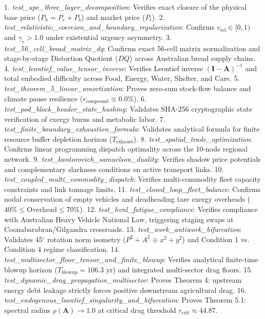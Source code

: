 \documentclass[preprint,12pt,authoryear]{elsarticle}
\theoremstyle{definition}
\begin{document}
1.  \textit{test\_upe\_three\_layer\_decomposition}: Verifies exact closure of the physical base price ($P_h = P_e + P_b$) and market price ($P_t$).
2.  \textit{test\_relativistic\_coercion\_and\_boundary\_regularization}: Confirms $v_{\text{rel}} \in [0, 1)$ and $\gamma_v > 1.0$ under existential urgency asymmetry.
3.  \textit{test\_56\_cell\_bread\_matrix\_dq}: Confirms exact 56-cell matrix normalization and stage-by-stage Distortion Quotient ($DQ$) across Australian bread supply chains.
4.  \textit{test\_leontief\_value\_tensor\_inverse}: Verifies Leontief inverse $(\mathbf{I} - \mathbf{A})^{-1}$ and total embodied difficulty across Food, Energy, Water, Shelter, and Care.
5.  \textit{test\_theorem\_5\_linear\_amortization}: Proves zero-sum stock-flow balance and climate pause resilience ($r_{\text{compound}} \equiv 0.0\%$).
6.  \textit{test\_pod\_block\_header\_state\_hashing}: Validates SHA-256 cryptographic state verification of exergy burns and metabolic labor.
7.  \textit{test\_finite\_boundary\_exhaustion\_formula}: Validates analytical formula for finite resource buffer depletion horizon ($T_{\text{exhaust}}$).
8.  \textit{test\_spatial\_trade\_optimization}: Confirms linear programming dispatch optimality across the 10-node regional network.
9.  \textit{test\_kantorovich\_samuelson\_duality}: Verifies shadow price potentials and complementary slackness conditions on active transport links.
10. \textit{test\_coupled\_multi\_commodity\_dispatch}: Verifies multi-commodity fleet capacity constraints and link tonnage limits.
11. \textit{test\_closed\_loop\_fleet\_balance}: Confirms nodal conservation of empty vehicles and deadheading tare exergy overheads ($40\% \le \text{Overhead} \le 70\%$).
12. \textit{test\_hvnl\_fatigue\_compliance}: Verifies compliance with Australian Heavy Vehicle National Law, triggering staging swaps at Coonabarabran/Gilgandra crossroads.
13. \textit{test\_work\_antiwork\_bifurcation}: Validates 45$^\circ$ rotation norm isometry ($P^2 + A^2 \equiv x^2 + y^2$) and Condition 1 vs. Condition 4 regime classification.
14. \textit{test\_multisector\_floor\_tensor\_and\_finite\_blowup}: Verifies analytical finite-time blowup horizon ($T_{\text{blowup}} = 106.3$ yr) and integrated multi-sector drag floors.
15. \textit{test\_dynamic\_drag\_propagation\_multisector}: Proves Theorem 4: upstream energy debt leakage strictly forces positive downstream agricultural drag.
16. \textit{test\_endogenous\_leontief\_singularity\_and\_bifurcation}: Proves Theorem 5.1: spectral radius $\rho(\mathbf{A}) \to 1.0$ at critical drag threshold $r_{\text{crit}} \approx 44.87$.
\end{document}
